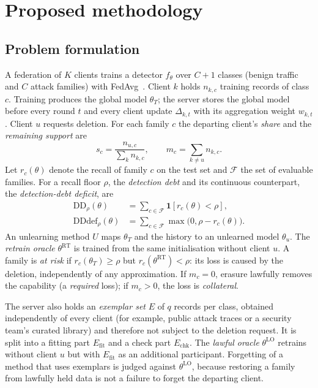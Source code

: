\documentclass[pdflatex,sn-mathphys-num,iicol]{sn-jnl}
\newcommand{\Efit}{E_{\mathrm{fit}}}
\newcommand{\Echk}{E_{\mathrm{chk}}}
\newcommand{\DD}{\mathrm{DD}_{\rho}}
\newcommand{\DDdef}{\mathrm{DDdef}_{\rho}}
\begin{document}
\section{Proposed methodology}\label{sec:method}

\subsection{Problem formulation}\label{sec:problem}

A federation of $K$ clients trains a detector $f_\theta$ over $C+1$ classes (benign traffic and $C$ attack families) with FedAvg~\cite{mcmahan2017}. Client $k$ holds $n_{k,c}$ training records of class $c$. Training produces the global model $\theta_T$; the server stores the global model before every round $t$ and every client update $\Delta_{k,t}$ with its aggregation weight $w_{k,t}$. Client $u$ requests deletion. For each family $c$ the departing client's \emph{share} and the \emph{remaining support} are
\begin{equation}
s_c=\frac{n_{u,c}}{\sum_k n_{k,c}},\qquad m_c=\sum_{k\neq u} n_{k,c}.
\end{equation}
Let $r_c(\theta)$ denote the recall of family $c$ on the test set and $\mathcal{F}$ the set of evaluable families. For a recall floor $\rho$, the \emph{detection debt} and its continuous counterpart, the \emph{detection-debt deficit}, are
\begin{align}
\DD(\theta)&=\textstyle\sum_{c\in\mathcal{F}}\mathbf{1}[r_c(\theta)<\rho],\\
\DDdef(\theta)&=\textstyle\sum_{c\in\mathcal{F}}\max\bigl(0,\rho-r_c(\theta)\bigr).
\end{align}
An unlearning method $U$ maps $\theta_T$ and the history to an unlearned model $\theta_u$. The \emph{retrain oracle} $\theta^{\mathrm{RT}}$ is trained from the same initialisation without client $u$. A family is \emph{at risk} if $r_c(\theta_T)\ge\rho$ but $r_c(\theta^{\mathrm{RT}})<\rho$: its loss is caused by the deletion, independently of any approximation. If $m_c=0$, erasure lawfully removes the capability (a \emph{required} loss); if $m_c>0$, the loss is \emph{collateral}.

The server also holds an \emph{exemplar set} $E$ of $q$ records per class, obtained independently of every client (for example, public attack traces or a security team's curated library) and therefore not subject to the deletion request. It is split into a fitting part $\Efit$ and a check part $\Echk$. The \emph{lawful oracle} $\theta^{\mathrm{LO}}$ retrains without client $u$ but with $\Efit$ as an additional participant. Forgetting of a method that uses exemplars is judged against $\theta^{\mathrm{LO}}$, because restoring a family from lawfully held data is not a failure to forget the departing client.
\end{document}
